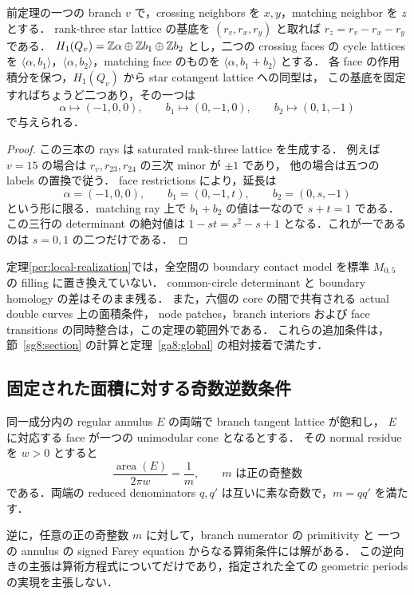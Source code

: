 \begin{lemma}
\label{per:branch-duality}
前定理の一つの branch $v$ で，crossing neighbors を $x,y$，matching neighbor を $z$ とする．
rank-three star lattice の基底を $(r_v,r_x,r_y)$ と取れば
$r_z=r_v-r_x-r_y$ である．
$H_1(Q_v)=\mathbb Z\alpha\oplus\mathbb Z b_1\oplus\mathbb Z b_2$ とし，二つの crossing faces の cycle lattices を
$\langle\alpha,b_1\rangle$，$\langle\alpha,b_2\rangle$，matching face のものを
$\langle\alpha,b_1+b_2\rangle$ とする．
各 face の作用積分を保つ，$H_1(Q_v)$ から star cotangent lattice への同型は，
この基底を固定すればちょうど二つあり，その一つは
\[
 \alpha\longmapsto(-1,0,0),\qquad
 b_1\longmapsto(0,-1,0),\qquad
 b_2\longmapsto(0,1,-1)
\]
で与えられる．
\end{lemma}

\begin{proof}
この三本の rays は saturated rank-three lattice を生成する．
例えば $v=15$ の場合は $r_v,r_{23},r_{24}$ の三次 minor が $\pm1$ であり，
他の場合は五つの labels の置換で従う．
face restrictions により，延長は
\[
 \alpha=(-1,0,0),\qquad b_1=(0,-1,t),\qquad b_2=(0,s,-1)
\]
という形に限る．matching ray 上で $b_1+b_2$ の値は一なので $s+t=1$ である．
この三行の determinant の絶対値は
$1-st=s^2-s+1$ となる．これが一であるのは $s=0,1$ の二つだけである．
\end{proof}

\begin{remark}[この局所存在が与えないもの]
\label{per:scope}
定理\ref{per:local-realization}では，全空間の boundary contact model を標準 $M_{0,5}$ の filling に置き換えていない．
common-circle determinant と boundary homology の差はそのまま残る．
また，六個の core の間で共有される actual double curves 上の面積条件，
node patches，branch interiors および face transitions の同時整合は，この定理の範囲外である．
これらの追加条件は，節~\ref{sg8:section} の計算と定理~\ref{ga8:global} の相対接着で満たす．
\end{remark}

\subsection{固定された面積に対する奇数逆数条件}

\begin{proposition}
\label{per:odd-reciprocal}
同一成分内の regular annulus $E$ の両端で branch tangent lattice が飽和し，
$E$ に対応する face が一つの unimodular cone となるとする．
その normal residue を $w>0$ とすると
\begin{equation}\label{per:odd-area-spectrum}
 \frac{\operatorname{area}(E)}{2\pi w}=\frac1m,
 \qquad m\text{ は正の奇整数}
\end{equation}
である．両端の reduced denominators $q,q'$ は互いに素な奇数で，$m=qq'$ を満たす．

逆に，任意の正の奇整数 $m$ に対して，branch numerator の primitivity と
一つの annulus の signed Farey equation からなる算術条件には解がある．
この逆向きの主張は算術方程式についてだけであり，指定された全ての geometric periods の実現を主張しない．
\end{proposition}

